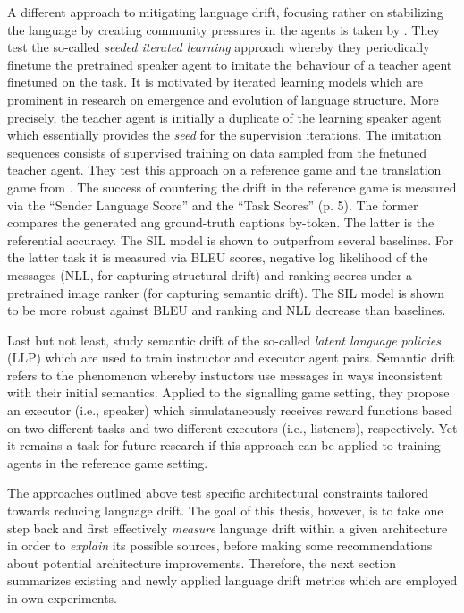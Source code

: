 A different approach to mitigating language drift, focusing rather on stabilizing the language by creating community pressures in the agents is taken by \cite{lu2020countering}. They test the so-called \textit{seeded iterated learning} approach whereby they periodically finetune the pretrained speaker agent to imitate the behaviour of a teacher agent finetuned on the task. It is motivated by iterated learning models which are prominent in research on emergence and evolution of language structure. More precisely, the teacher agent is initially a duplicate of the learning speaker agent which essentially provides the \textit{seed} for the supervision iterations. The imitation sequences consists of supervised training on data sampled from the fnetuned teacher agent. They test this approach on a reference game and the translation game from \cite{lee2019countering}. The success of countering the drift in the reference game is measured via the ``Sender Language Score'' and the ``Task Scores'' (p. 5). The former compares the generated ang ground-truth captions by-token. The latter is the referential accuracy. The SIL model is shown to outperfrom several baselines.
For the latter task it is measured via BLEU scores, negative log likelihood of the messages (NLL, for capturing structural drift) and ranking scores under a pretrained image ranker (for capturing semantic drift). The SIL model is shown to be more robust against BLEU and ranking and NLL decrease than baselines.

Last but not least, \cite{jacob2021multitasking} study semantic drift of the so-called \textit{latent language policies} (LLP) which are used to train instructor and executor agent pairs. Semantic drift refers to the phenomenon whereby instuctors use messages in ways inconsistent with their initial semantics. Applied to the signalling game setting, they propose an executor (i.e., speaker) which simulataneously receives reward functions based on two different tasks and two different executors (i.e., listeners), respectively. Yet it remains a task for future research if this approach can be applied to training agents in the reference game setting.

The approaches outlined above test specific architectural constraints tailored towards reducing language drift. The goal of this thesis, however, is to take one step back and first effectively \textit{measure} language drift within a given architecture in order to \textit{explain} its possible sources, before making some recommendations about potential architecture improvements. Therefore, the next section summarizes existing and newly applied language drift metrics which are employed in own experiments.  

